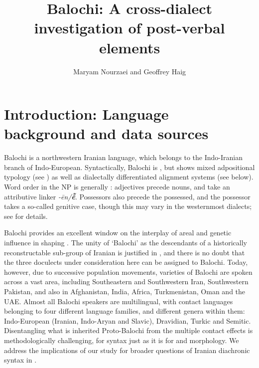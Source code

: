 \documentclass[output=paper,colorlinks,citecolor=brown,draftmode]{langscibook}
\author{Maryam Nourzaei\affiliation{Uppsala University} and Geoffrey Haig\orcid{0000-0002-5410-3692}\affiliation{University of Bamberg}}
\title{Balochi: A cross-dialect investigation of post-verbal elements}
\begin{document}
\maketitle\label{WOWA:ch:4}


\section{Introduction: Language background and data sources}\label{Balochi:ss:1}

Balochi is a northwestern Iranian language, which belongs to the Indo-Iranian branch of Indo-European. Syntactically, Balochi is , but shows mixed adpositional typology (see ) as well as dialectally differentiated alignment systems (see below). Word order in the NP is generally : adjectives precede nouns, and take an attributive linker \textit{-ēn/\textbf{ễ}}. Possessors also precede the possessed, and the possessor takes a so-called genitive case, though this may vary in the westernmost dialects; see  for details.

Balochi provides an excellent window on the interplay of areal and genetic influence in shaping . The unity of `Balochi' as the descendants of a historically reconstructable sub-group of Iranian is justified in \citet[21]{korn_towards_2005}, and there is no doubt that the three doculects under consideration here can be assigned to Balochi. Today, however, due to successive population movements, varieties of Balochi are spoken across a vast area, including Southeastern and Southwestern Iran, Southwestern Pakistan, and also in Afghanistan, India, Africa, Turkmenistan, Oman and the UAE. Almost all Balochi speakers are multilingual, with contact languages belonging to four different language families, and different genera within them: Indo-European (Iranian, Indo-Aryan and Slavic), Dravidian, Turkic and Semitic. Disentangling what is inherited Proto-Balochi from the multiple contact effects is methodologically challenging, for syntax just as it is for  and morphology. We address the implications of our study for broader questions of Iranian diachronic syntax in .

\largerpage
\end{document}
